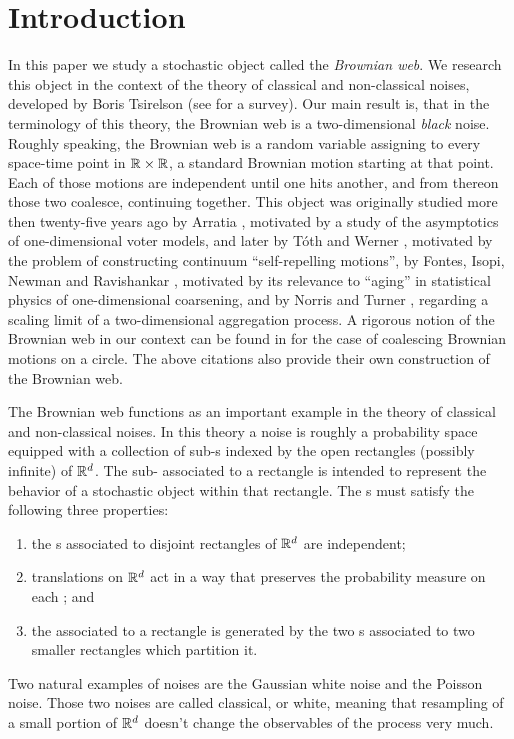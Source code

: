 {\section{Introduction}
In this paper we study a stochastic object called the \emph{Brownian web}. We
research this object in the context of the theory of classical and
non-classical noises, developed by Boris Tsirelson
(see \cite{tsirelson-nonclassical-stochastic-flows} for a survey).
Our main result
is, that in the terminology of this theory, the Brownian web is a
two-dimensional \emph{black} noise.
Roughly speaking, the Brownian web is a random variable assigning to
every space-time point in $\mathbb{R}\times\mathbb{R}$, a standard Brownian motion starting
at that point. Each of those motions are independent until one hits another,
and from thereon those two coalesce, continuing together. This object was
originally studied more then twenty-five years ago by Arratia \cite{arratia}, motivated
by a study of the asymptotics of one-dimensional voter models, and later
by T\'{o}th and Werner \cite{toth-werner},
motivated by the problem of constructing continuum
``self-repelling motions'', by Fontes, Isopi, Newman and Ravishankar
\cite{fontes-et-al},
motivated by its relevance to ``aging'' in statistical physics of
one-dimensional coarsening, and by Norris and Turner
\cite{norris-turner-convergence-to-bw},\cite{norris-turner-planar-aggregation}
regarding a scaling limit of a two-dimensional aggregation process.
A rigorous notion of the Brownian web in our context
can be found in \cite{tsirelson-lecture-course} for the case of coalescing
Brownian motions on a circle.  The above citations also provide
their own construction of the Brownian web.

The Brownian web functions as an important example in the theory of
classical and non-classical noises. In this
theory a noise is roughly a probability space equipped with a collection
of sub-\sigfield{}s indexed by the open rectangles (possibly infinite) of
$\mathbb{R}^d$.  The sub-\sigfield{} associated to a rectangle is intended to
represent the behavior of a stochastic object within that rectangle.
The \sigfield{}s must satisfy the following three properties:
\begin{enumerate}
\item the \sigfield{}s associated to disjoint rectangles of $\mathbb{R}^d$ are
independent;
\item translations on $\mathbb{R}^d$ act in a way that preserves the
probability measure on each \sigfield{}; and
\item the \sigfield{}
associated to a rectangle is generated by the two \sigfield{}s
associated to two smaller rectangles which partition it.
\end{enumerate}
Two natural examples of noises are the Gaussian white noise
and the Poisson noise. Those two noises are called classical, or white,
meaning that
resampling of a small portion of $\mathbb{R}^d$ doesn't change the observables of the
process very much.

}
